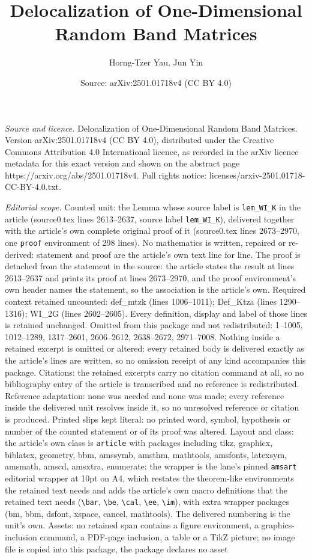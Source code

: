 \documentclass[10pt,a4paper]{amsart}
\title[Delocalization of One-Dimensional Random Band Matrices]{Delocalization of One-Dimensional Random Band Matrices}
\author{Horng-Tzer Yau, Jun Yin}
\date{Source: arXiv:2501.01718v4 (CC BY 4.0)}
\begin{document}
\maketitle

\noindent\emph{Source and licence.} Delocalization of One-Dimensional Random Band Matrices. Version arXiv:2501.01718v4 (CC BY 4.0), distributed under the Creative Commons Attribution 4.0 International licence, as recorded in the arXiv licence metadata for this exact version and shown on the abstract page https://arxiv.org/abs/2501.01718v4. Full rights notice: licenses/arxiv-2501.01718-CC-BY-4.0.txt.\par\smallskip

\noindent\textit{Editorial scope.} Counted unit: the Lemma whose source label is \texttt{lem\_WI\_K} in the article (source0.tex lines 2613--2637, source label \texttt{lem\_WI\_K}), delivered together with the article's own complete original proof of it (source0.tex lines 2673--2970, one \texttt{proof} environment of 298 lines). No mathematics is written, repaired or re-derived: statement and proof are the article's own text line for line. The proof is detached from the statement in the source: the article states the result at lines 2613--2637 and prints its proof at lines 2673--2970, and the proof environment's own header names the statement, so the association is the article's own. Required context retained uncounted: def\_mtzk (lines 1006--1011); Def\_Ktza (lines 1290--1316); WI\_2G (lines 2602--2605). Every definition, display and label of those lines is retained unchanged. Omitted from this package and not redistributed: 1--1005, 1012--1289, 1317--2601, 2606--2612, 2638--2672, 2971--7008. Nothing inside a retained excerpt is omitted or altered: every retained body is delivered exactly as the article's lines are written, so no omission receipt of any kind accompanies this package. Citations: the retained excerpts carry no citation command at all, so no bibliography entry of the article is transcribed and no reference is redistributed. Reference adaptation: none was needed and none was made; every reference inside the delivered unit resolves inside it, so no unresolved reference or citation is produced. Printed slips kept literal: no printed word, symbol, hypothesis or number of the counted statement or of its proof was altered. Layout and class: the article's own class is \texttt{article} with packages including tikz, graphicx, biblatex, geometry, bbm, amssymb, amsthm, mathtools, amsfonts, latexsym, amsmath, amscd, amsxtra, enumerate; the wrapper is the lane's pinned \texttt{amsart} editorial wrapper at 10pt on A4, which restates the theorem-like environments the retained text needs and adds the article's own macro definitions that the retained text needs (\texttt{\textbackslash bar}, \texttt{\textbackslash be}, \texttt{\textbackslash cal}, \texttt{\textbackslash ee}, \texttt{\textbackslash im}), with extra wrapper packages (bm, bbm, dsfont, xspace, cancel, mathtools). The delivered numbering is the unit's own. Assets: no retained span contains a figure environment, a graphics-inclusion command, a PDF-page inclusion, a table or a TikZ picture; no image file is copied into this package, the package declares no asset 
\end{document}
